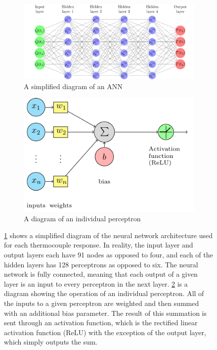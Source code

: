 \documentclass{article}
\begin{document}
\begin{figure}[htbp]
  \centering
  \begin{subfigure}[t]{.75\textwidth}
      \centering
      \includegraphics[width=\textwidth,keepaspectratio]{figures/neural_network_diagram.pdf}
      \caption{A simplified diagram of an ANN}
      \label{fig:neural_network_diagram}
  \end{subfigure}
  \begin{subfigure}[t]{.5\textwidth}
      \centering
      \includegraphics[width=\textwidth ,keepaspectratio]{figures/perceptron_diagram.pdf}
      \caption{A diagram of an individual perceptron}
      \label{fig:perceptron_diagram}
  \end{subfigure}
  \caption{\protect\ref{fig:neural_network_diagram} shows a simplified diagram of the neural network architecture used for each thermocouple response. In reality, the input layer and output layers each have 91 nodes as opposed to four, and each of the hidden layers has 128 perceptrons as opposed to six. The neural network is fully connected, meaning that each output of a given layer is an input to every perceptron in the next layer. \protect\ref{fig:perceptron_diagram} is a diagram showing the operation of an individual perceptron. All of the inputs to a given perceptron are weighted and then summed with an additional bias parameter. The result of this summation is sent through an activation function, which is the rectified linear activation function (ReLU) with the exception of the output layer, which simply outputs the sum.} 
  \label{fig:neural_network_drawings}
\end{figure}
\end{document}
